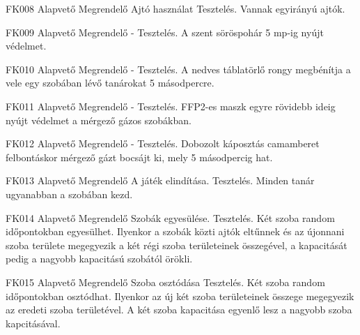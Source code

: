 \begin{funkovetelmeny}
	{FK008}
	{Alapvető}
	{Megrendelő}
	{Ajtó használat}
	{Tesztelés.}
	{Vannak egyirányú ajtók.}
\end{funkovetelmeny}
\begin{funkovetelmeny}
	{FK009}
	{Alapvető}
	{Megrendelő}
	{-}
	{Tesztelés.}
	{A szent söröspohár 5 mp-ig nyújt védelmet.}
\end{funkovetelmeny}
\begin{funkovetelmeny}
	{FK010}
	{Alapvető}
	{Megrendelő}
	{-}
	{Tesztelés.}
	{A nedves táblatörlő rongy megbénítja a vele egy szobában lévő tanárokat 5 másodpercre.}
\end{funkovetelmeny}
\begin{funkovetelmeny}
	{FK011}
	{Alapvető}
	{Megrendelő}
	{-}
	{Tesztelés.}
	{FFP2-es maszk egyre rövidebb ideig nyújt védelmet a mérgező gázos szobákban.}
\end{funkovetelmeny}
\begin{funkovetelmeny}
	{FK012}
	{Alapvető}
	{Megrendelő}
	{-}
	{Tesztelés.}
	{Dobozolt káposztás camamberet felbontáskor mérgező gázt bocsájt ki, mely 5 másodpercig hat.}
\end{funkovetelmeny}
\begin{funkovetelmeny}
	{FK013}
	{Alapvető}
	{Megrendelő}
	{A játék elindítása.}
	{Tesztelés.}
	{Minden tanár ugyanabban a szobában kezd.}
\end{funkovetelmeny}
\begin{funkovetelmeny}
	{FK014}
	{Alapvető}
	{Megrendelő}
	{Szobák egyesülése.}
	{Tesztelés.}
	{Két szoba random időpontokban egyesülhet. Ilyenkor a szobák közti ajtók eltűnnek és az újonnani szoba területe megegyezik a két régi szoba területeinek összegével, a kapacitását pedig a nagyobb kapacitású szobától örökli.}
\end{funkovetelmeny}
\begin{funkovetelmeny}
	{FK015}
	{Alapvető}
	{Megrendelő}
	{Szoba osztódása}
	{Tesztelés.}
	{Két szoba random időpontokban osztódhat. Ilyenkor az új két szoba területeinek összege megegyezik az eredeti szoba területével. A  két szoba kapacitása egyenlő lesz a nagyobb szoba kapcitásával.}
\end{funkovetelmeny}
